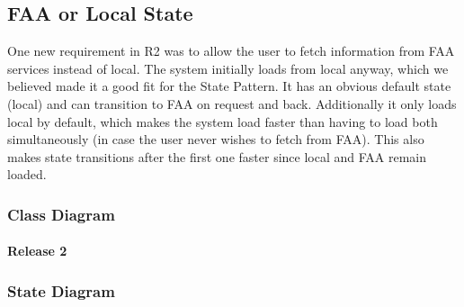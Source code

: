 \newpage

\subsection{FAA or Local State}\label{subsec:faaOrLocalState}

\indent
One new requirement in R2 was to allow the user to fetch information from FAA services instead of local. The system initially loads from local anyway, which we believed made it a good fit for the State Pattern. It has an obvious default state (local) and can transition to FAA on request and back. Additionally it only loads local by default, which makes the system load faster than having to load both simultaneously (in case the user never wishes to fetch from FAA). This also makes state transitions after the first one faster since local and FAA remain loaded.

\subsubsection{Class Diagram}

\paragraph{Release 2}

\begin{center}
\end{center}

\subsubsection{State Diagram}

